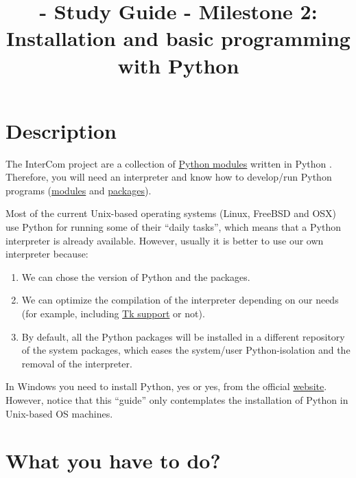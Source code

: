 
\title{\TM{} - Study Guide - Milestone 2: Installation and basic programming with Python}

\maketitle

\section{Description}

The InterCom project \cite{intercom} are a collection of
\href{https://docs.python.org/3/tutorial/modules.html#}{Python
  modules} written in Python \cite{python}. Therefore, you will need
an interpreter and know how to develop/run Python programs
(\href{https://docs.python.org/3/tutorial/modules.html#modules}{modules}
and
\href{https://docs.python.org/3/tutorial/modules.html#packages}{packages}).

Most of the current Unix-based operating systems (Linux, FreeBSD and
OSX) use Python for running some of their ``daily tasks'', which means
that a Python interpreter is already available. However, usually it is
better to use our own interpreter because:

\begin{enumerate}

\item We can chose the version of Python and the packages.

\item We can optimize the compilation of the interpreter depending on
  our needs (for example, including
  \href{https://wiki.python.org/moin/TkInter}{Tk support} or not).

\item By default, all the Python packages will be installed in a
  different repository of the system packages, which eases the
  system/user Python-isolation and the removal of the interpreter.

\end{enumerate}

In Windows you need to install Python, yes or yes, from the official
\href{https://www.python.org/downloads/}{website}. However, notice
that this ``guide'' only contemplates the installation of Python in
Unix-based OS machines.

\section{What you have to do?}

